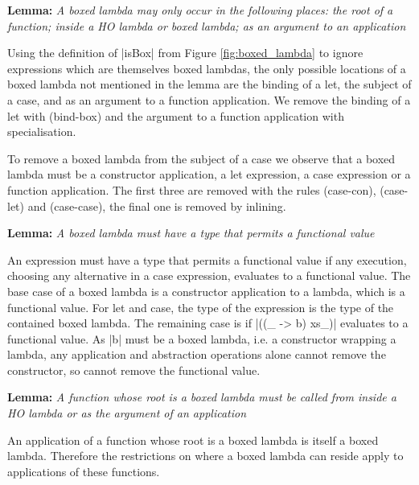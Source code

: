 \documentclass[preprint]{sigplanconf}
\newenvironment{lemma}[1]
    {\smallskip
     \noindent\textbf{Lemma:} \textit{#1}}
    {\noexample}
\begin{document}
\begin{lemma}{A boxed lambda may only occur in the following places: the root of a function; inside a HO lambda or boxed lambda; as an argument to an application}

Using the definition of |isBox| from Figure \ref{fig:boxed_lambda} to ignore expressions which are themselves boxed lambdas, the only possible locations of a boxed lambda not mentioned in the lemma are the binding of a let, the subject of a case, and as an argument to a function application. We remove the binding of a let with (bind-box) and the argument to a function application with specialisation.

To remove a boxed lambda from the subject of a case we observe that a boxed lambda must be a constructor application, a let expression, a case expression or a function application. The first three are removed with the rules (case-con), (case-let) and (case-case), the final one is removed by inlining.
\end{lemma}

\begin{lemma}{A boxed lambda must have a type that permits a functional value}

An expression must have a type that permits a functional value if any execution, choosing any alternative in a case expression, evaluates to a functional value. The base case of a boxed lambda is a constructor application to a lambda, which is a functional value. For let and case, the type of the expression is the type of the contained boxed lambda. The remaining case is if |((\vs_ -> b) xs_)| evaluates to a functional value. As |b| must be a boxed lambda, i.e. a constructor wrapping a lambda, any application and abstraction operations alone cannot remove the constructor, so cannot remove the functional value.
\end{lemma}

\begin{lemma}{A function whose root is a boxed lambda must be called from inside a HO lambda or as the argument of an application}

An application of a function whose root is a boxed lambda is itself a boxed lambda. Therefore the restrictions on where a boxed lambda can reside apply to applications of these functions.
\end{lemma}
\end{document}

